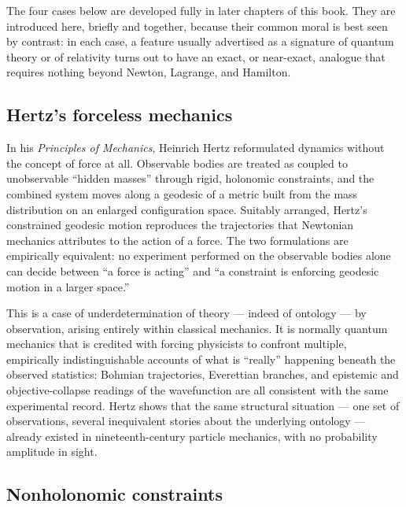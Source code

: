 The four cases below are developed fully in later chapters of this book. They
are introduced here, briefly and together, because their common moral is best
seen by contrast: in each case, a feature usually advertised as a signature of
quantum theory or of relativity turns out to have an exact, or near-exact,
analogue that requires nothing beyond Newton, Lagrange, and Hamilton.

\subsection{Hertz's forceless mechanics }

In his \emph{Principles of Mechanics}, Heinrich Hertz reformulated dynamics
without the concept of force at all. Observable bodies are treated as coupled to
unobservable ``hidden masses'' through rigid, holonomic constraints, and the
combined system moves along a geodesic of a metric built from the mass
distribution on an enlarged configuration space. Suitably arranged, Hertz's
constrained geodesic motion reproduces the trajectories that Newtonian mechanics
attributes to the action of a force. The two formulations are empirically
equivalent: no experiment performed on the observable bodies alone can decide
between ``a force is acting'' and ``a constraint is enforcing geodesic motion in
a larger space.''

This is a case of underdetermination of theory --- indeed of ontology --- by
observation, arising entirely within classical mechanics. It is normally quantum
mechanics that is credited with forcing physicists to confront multiple,
empirically indistinguishable accounts of what is ``really'' happening beneath
the observed statistics: Bohmian trajectories, Everettian branches, and
epistemic and objective-collapse readings of the wavefunction are all consistent
with the same experimental record. Hertz shows that the same structural
situation --- one set of observations, several inequivalent stories about the
underlying ontology --- already existed in nineteenth-century particle mechanics,
with no probability amplitude in sight.

\subsection{Nonholonomic constraints }

